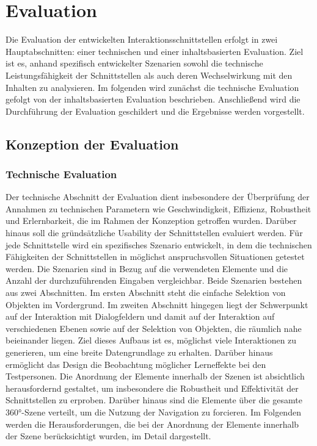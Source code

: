 \chapter{Evaluation}
\label{chap:Evaluation}

Die Evaluation der entwickelten Interaktionsschnittstellen erfolgt in zwei Hauptabschnitten: einer technischen und einer inhaltsbasierten Evaluation. Ziel ist es, anhand spezifisch entwickelter Szenarien sowohl die technische Leistungsfähigkeit der Schnittstellen als auch deren Wechselwirkung mit den Inhalten zu analysieren. Im folgenden wird zunächst die technische Evaluation gefolgt von der inhaltsbasierten Evaluation beschrieben. Anschließend wird die Durchführung der Evaluation geschildert und die Ergebnisse werden vorgestellt. 

\section{Konzeption der Evaluation}

\subsection{Technische Evaluation}

Der technische Abschnitt der Evaluation dient insbesondere der Überprüfung der Annahmen zu technischen Parametern wie Geschwindigkeit, Effizienz, Robustheit und Erlernbarkeit, die im Rahmen der Konzeption getroffen wurden. Darüber hinaus soll die gründsätzliche Usability der Schnittstellen evaluiert werden. Für jede Schnittstelle wird ein spezifisches Szenario entwickelt, in dem die technischen Fähigkeiten der Schnittstellen in möglichst anspruchsvollen Situationen getestet werden. Die Szenarien sind in Bezug auf die verwendeten Elemente und die Anzahl der durchzuführenden Eingaben vergleichbar. Beide Szenarien bestehen aus zwei Abschnitten. Im ersten Abschnitt steht die einfache Selektion von Objekten im Vordergrund. Im zweiten Abschnitt hingegen liegt der Schwerpunkt auf der Interaktion mit Dialogfeldern und damit auf der Interaktion auf verschiedenen Ebenen sowie auf der Selektion von Objekten, die räumlich nahe beieinander liegen. Ziel dieses Aufbaus ist es, möglichst viele Interaktionen zu generieren, um eine breite Datengrundlage zu erhalten. Darüber hinaus ermöglicht das Design die Beobachtung möglicher Lerneffekte bei den Testpersonen. Die Anordnung der Elemente innerhalb der Szenen ist absichtlich herausfordernd gestaltet, um insbesondere die Robustheit und Effektivität der Schnittstellen zu erproben. Darüber hinaus sind die Elemente über die gesamte 360°-Szene verteilt, um die Nutzung der Navigation zu forcieren. Im Folgenden werden die Herausforderungen, die bei der Anordnung der Elemente innerhalb der Szene berücksichtigt wurden, im Detail dargestellt. 

